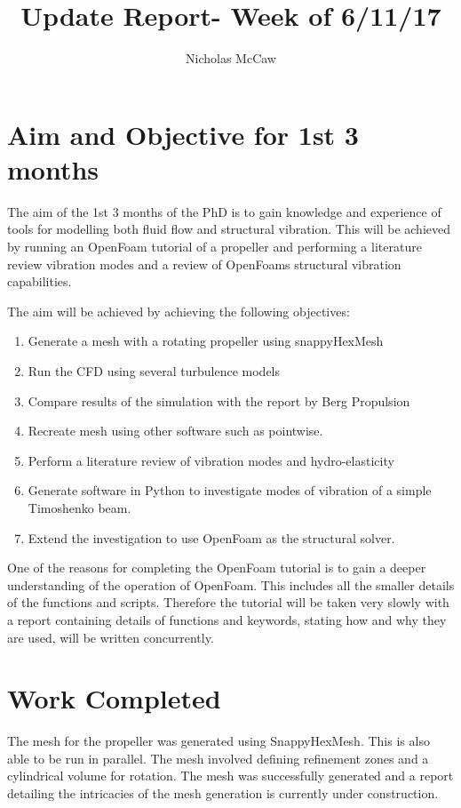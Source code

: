 \documentclass{article}
\title{Update Report- Week of 6/11/17}
\author{Nicholas McCaw}
\begin{document}
	\maketitle
	
	\section{Aim and Objective for 1st 3 months}
		The aim of the 1st 3 months of the PhD is to gain knowledge and experience of tools for modelling both fluid flow and structural vibration. This will be achieved by running an OpenFoam tutorial of a propeller and performing a literature review vibration modes and a review of OpenFoams structural vibration capabilities.
		
		
		The aim will be achieved by achieving the following objectives:
		\begin{enumerate}
			\item Generate a mesh with a rotating propeller using snappyHexMesh
			\item Run the CFD using several turbulence models
			\item Compare results of the simulation with the report by Berg Propulsion
			\item Recreate mesh using other software such as pointwise.
			\item Perform a literature review of vibration modes and hydro-elasticity
			\item Generate software in Python to investigate modes of vibration of a simple Timoshenko beam.
			\item Extend the investigation to use OpenFoam as the structural solver.
		\end{enumerate}
	One of the reasons for completing the OpenFoam tutorial is to gain a deeper understanding of the operation of OpenFoam. This includes all the smaller details of the functions and scripts. Therefore the tutorial will be taken very slowly with a report containing details of functions and keywords, stating how and why they are used, will be written concurrently.
	
	\section{Work Completed}
	The mesh for the propeller was generated using SnappyHexMesh. This is also able to be run in parallel. The mesh involved defining refinement zones and a cylindrical volume for rotation. The mesh was successfully generated and a report detailing the intricacies of the mesh generation is currently under construction.
	
\end{document}
